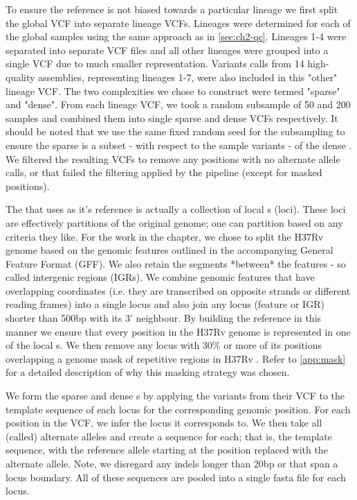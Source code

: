 To ensure the reference \prg{} is not biased towards a particular lineage we first split the global \cryptic{} VCF into separate lineage VCFs. Lineages were determined for each of the global samples using the same approach as in \autoref{sec:ch2-qc}. Lineages 1-4 were separated into separate VCF files and all other lineages were grouped into a single VCF due to much smaller representation. Variants calls from 14 high-quality \mtb{} assemblies, representing lineages 1-7, were also included in this "other" lineage VCF. The two \prg{} complexities we chose to construct were termed "sparse" and "dense". From each lineage VCF, we took a random subsample of 50 and 200 samples and combined them into single sparse and dense VCFs respectively. It should be noted that we use the same fixed random seed for the subsampling to ensure the sparse \prg{} is a subset - with respect to the sample variants - of the dense \prg{}. We filtered the resulting VCFs to remove any positions with no alternate allele calls, or that failed the filtering applied by the \cryptic{} pipeline (except for masked positions).  

The \prg{} that \pandora{} uses as it's reference is actually a collection of local \prg{}s (loci). These loci are effectively partitions of the original genome; one can partition based on any criteria they like. For the work in the chapter, we chose to split the H37Rv genome based on the genomic features outlined in the accompanying General Feature Format (GFF). We also retain the segments *between* the features - so called intergenic regions (IGRs). We combine genomic features that have overlapping coordinates (i.e. they are transcribed on opposite strands or different reading frames) into a single locus and also join any locus (feature or IGR) shorter than 500bp with its 3' neighbour. By building the reference \prg{} in this manner we ensure that every position in the H37Rv genome is represented in one of the local \prg{}s. We then remove any locus with 30\% or more of its positions overlapping a genome mask of repetitive regions in H37Rv \cite{tbmask2014}. Refer to \autoref{app:mask} for a detailed description of why this masking strategy was chosen.

We form the sparse and dense \prg{}s by applying the variants from their VCF to the template sequence of each locus for the corresponding genomic position. For each position in the VCF, we infer the locus it corresponds to. We then take all (called) alternate alleles and create a sequence for each; that is, the template sequence, with the reference allele starting at the position replaced with the alternate allele. Note, we disregard any indels longer than 20bp or that span a locus boundary. All of these sequences are pooled into a single fasta file for each locus. 

